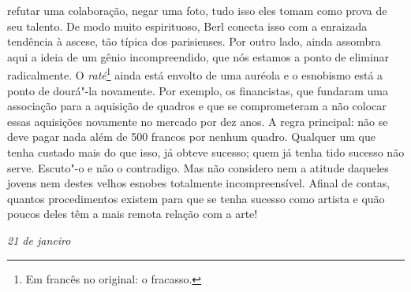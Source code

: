 refutar uma colaboração, negar uma foto, tudo isso eles tomam como prova
de seu talento. De modo muito espirituoso, Berl conecta isso com a
enraizada tendência à ascese, tão típica dos parisienses. Por outro lado,
ainda assombra aqui a ideia de um gênio incompreendido, que nós estamos a ponto de eliminar
radicalmente. O \emph{raté}\footnote{Em francês no original:
o fracasso. \versal{[N.~T.]}} ainda está envolto de
uma auréola e o esnobismo está a ponto de dourá"-la novamente. Por
exemplo, os financistas, que fundaram uma associação para a aquisição de
quadros e que se comprometeram a não colocar essas aquisições novamente
no mercado por dez anos. A regra principal: não se deve pagar nada além
de 500 francos por nenhum quadro. Qualquer um que tenha custado mais do
que isso, já obteve sucesso; quem já tenha tido sucesso não serve.
Escuto"-o e não o contradigo. Mas não considero nem a atitude daqueles jovens
nem destes velhos esnobes totalmente incompreensível. Afinal de contas,
quantos procedimentos existem para que se tenha sucesso como artista e
quão poucos deles têm a mais remota relação com a arte!


\begin{flushright}
\emph{21 de janeiro}
\end{flushright}

